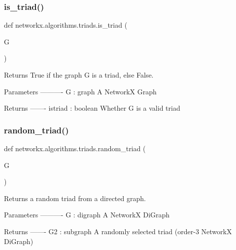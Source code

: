 \subsubsection{\texorpdfstring{is\+\_\+triad()}{is\_triad()}}
{\footnotesize\ttfamily def networkx.\+algorithms.\+triads.\+is\+\_\+triad (\begin{DoxyParamCaption}\item[{}]{G }\end{DoxyParamCaption})}

\begin{DoxyVerb}Returns True if the graph G is a triad, else False.

Parameters
----------
G : graph
   A NetworkX Graph

Returns
-------
istriad : boolean
   Whether G is a valid triad
\end{DoxyVerb}
 \mbox{\label{namespacenetworkx_1_1algorithms_1_1triads_a9a4217f662df5f5ad284364071f93975}} 
\subsubsection{\texorpdfstring{random\+\_\+triad()}{random\_triad()}}
{\footnotesize\ttfamily def networkx.\+algorithms.\+triads.\+random\+\_\+triad (\begin{DoxyParamCaption}\item[{}]{G }\end{DoxyParamCaption})}

\begin{DoxyVerb}Returns a random triad from a directed graph.

Parameters
----------
G : digraph
   A NetworkX DiGraph

Returns
-------
G2 : subgraph
   A randomly selected triad (order-3 NetworkX DiGraph)
\end{DoxyVerb}
 \mbox{\label{namespacenetworkx_1_1algorithms_1_1triads_aa61741a7f9abacb117f4dfe6651d51f8}} 
